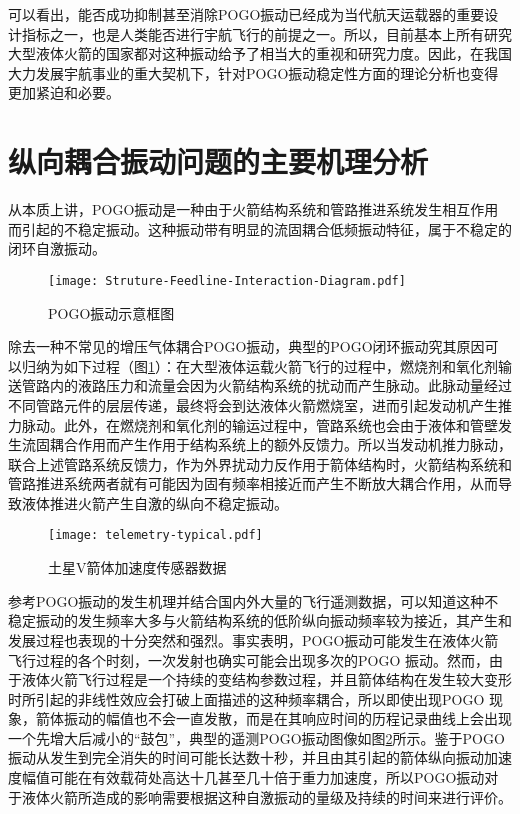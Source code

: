 可以看出，能否成功抑制甚至消除POGO振动已经成为当代航天运载器的重要设计指标之一，也是人类能否进行宇航飞行的前提之一。所以，目前基本上所有研究大型液体火箭的国家都对这种振动给予了相当大的重视和研究力度。因此，在我国大力发展宇航事业的重大契机下，针对POGO振动稳定性方面的理论分析也变得更加紧迫和必要。

\section{纵向耦合振动问题的主要机理分析}
\label{sec:POGO_Mechanicsm}
从本质上讲，POGO振动是一种由于火箭结构系统和管路推进系统发生相互作用而引起的不稳定振动。这种振动带有明显的流固耦合低频振动特征，属于不稳定的闭环自激振动\cite{Rubin:1973, Doiron:1977, Huang-Huaide:1987}。

\begin{figure}[h]
  \centering
  \texttt{[image: Struture-Feedline-Interaction-Diagram.pdf]}
  \caption{POGO振动示意框图}\label{Interaction-Diagram}
\end{figure}

除去一种不常见的增压气体耦合POGO振动\cite{Rubin:1970}，典型的POGO闭环振动究其原因可以归纳为如下过程（图\ref{Interaction-Diagram}）：在大型液体运载火箭飞行的过程中，燃烧剂和氧化剂输送管路内的液路压力和流量会因为火箭结构系统的扰动而产生脉动。此脉动量经过不同管路元件的层层传递，最终将会到达液体火箭燃烧室，进而引起发动机产生推力脉动。此外，在燃烧剂和氧化剂的输运过程中，管路系统也会由于液体和管壁发生流固耦合作用而产生作用于结构系统上的额外反馈力\cite{About:1987, Paidoussis:1993}。所以当发动机推力脉动，联合上述管路系统反馈力，作为外界扰动力反作用于箭体结构时，火箭结构系统和管路推进系统两者就有可能因为固有频率相接近而产生不断放大耦合作用，从而导致液体推进火箭产生自激的纵向不稳定振动\cite{Rubin:1970, Oppenheim:1993}。

\begin{figure}[!htb]
  \centering
  \texttt{[image: telemetry-typical.pdf]}
  \caption{土星V箭体加速度传感器数据}\label{telemetry-typical}
\end{figure}

参考POGO振动的发生机理并结合国内外大量的飞行遥测数据\cite{Feng-Zhenxing:1981}，可以知道这种不稳定振动的发生频率大多与火箭结构系统的低阶纵向振动频率较为接近，其产生和发展过程也表现的十分突然和强烈。事实表明，POGO振动可能发生在液体火箭飞行过程的各个时刻，一次发射也确实可能会出现多次的POGO 振动\cite{Larsen:2008}。然而，由于液体火箭飞行过程是一个持续的变结构参数过程，并且箭体结构在发生较大变形时所引起的非线性效应会打破上面描述的这种频率耦合，所以即使出现POGO 现象，箭体振动的幅值也不会一直发散，而是在其响应时间的历程记录曲线上会出现一个先增大后减小的“鼓包”，典型的遥测POGO振动图像如图\ref{telemetry-typical}所示。鉴于POGO振动从发生到完全消失的时间可能长达数十秒，并且由其引起的箭体纵向振动加速度幅值可能在有效载荷处高达十几甚至几十倍于重力加速度，所以POGO振动对于液体火箭所造成的影响需要根据这种自激振动的量级及持续的时间来进行评价\cite{Wang-Qizheng:1999}。



